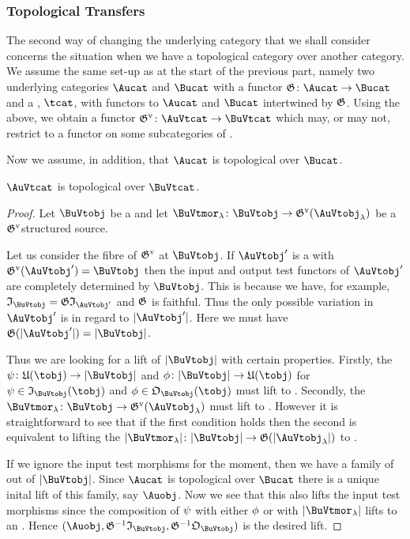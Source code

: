 \documentclass[%
a4paper,%
arxiv,%
defaults
]{myclass}
\begin{document}
\subsubsection{Topological Transfers}

The second way of changing the underlying category that we shall consider concerns the situation when we have a topological category over another category.
We assume the same set\hyp{}up as at the start of the previous part, namely two underlying categories \(\Aucat\) and \(\Bucat\) with a functor \(\subfunc \colon \Aucat \to \Bucat\) and a \tcat, \(\tcat\), with functors to \(\Aucat\) and \(\Bucat\) intertwined by \(\subfunc\).
Using the above, we obtain a functor \(\mVo{\subfunc} \colon \AuVtcat \to \BuVtcat\) which may, or may not, restrict to a functor on some subcategories of \uFVtobjs.

Now we assume, in addition, that \(\Aucat\) is topological over \(\Bucat\).

\begin{lemma}
\(\AuVtcat\) is topological over \(\BuVtcat\).
\end{lemma}

\begin{proof}
Let \(\BuVtobj\) be a \BuVtobj and let \(\BuVtmor_\lambda \colon \BuVtobj \to \mVo{\subfunc}(\AuVtobj_\lambda)\) be a \(\mVo{\subfunc}\)\enhyp{}structured source.

Let us consider the fibre of \(\mVo{\subfunc}\) at \(\BuVtobj\).
If \(\AuVtobj'\) is a \AuVtobj with \(\mVo{\subfunc}(\AuVtobj') = \BuVtobj\) then the input and output test functors of \(\AuVtobj'\) are completely determined by \(\BuVtobj\).
This is because we have, for example, \(\itest_{\BuVtobj} = \subfunc\itest_{\AuVtobj'}\) and \(\subfunc\) is faithful.
Thus the only possible variation in \(\AuVtobj'\) is in regard to \(\sabs{\AuVtobj'}\).
Here we must have \(\subfunc(\sabs{\AuVtobj'}) = \sabs{\BuVtobj}\).

Thus we are looking for a lift of \(\sabs{\BuVtobj}\) with certain properties.
Firstly, the \Bumors \(\ifn \colon \ufunc(\tobj) \to \sabs{\BuVtobj}\) and \(\ofn \colon \sabs{\BuVtobj} \to \ufunc(\tobj)\) for \(\ifn \in \itest_{\BuVtobj}(\tobj)\) and \(\ofn \in \otest_{\BuVtobj}(\tobj)\) must lift to \Aumors.
Secondly, the \BuVtmors \(\BuVtmor_\lambda \colon \BuVtobj \to \mVo{\subfunc}(\AuVtobj_\lambda)\) must lift to \AuVtmors.
However it is straightforward to see that if the first condition holds then the second is equivalent to lifting the \Bumors \(\sabs{\BuVtmor_\lambda} \colon \sabs{\BuVtobj} \to \subfunc(\sabs{\AuVtobj_\lambda})\) to \Aumors.

If we ignore the input test morphisms for the moment, then we have a family of \Bumors out of \(\sabs{\BuVtobj}\).
Since \(\Aucat\) is topological over \(\Bucat\) there is a unique inital lift of this family, say \(\Auobj\).
Now we see that this also lifts the input test morphisms since the composition of \(\psi\) with either \(\phi\) or with \(\sabs{\BuVtmor_\lambda}\) lifts to an \Aumor.
Hence \((\Auobj, \subfunc^{-1}\itest_{\BuVtobj}, \subfunc^{-1}\otest_{\BuVtobj})\) is the desired lift.
\end{proof}
\end{document}
